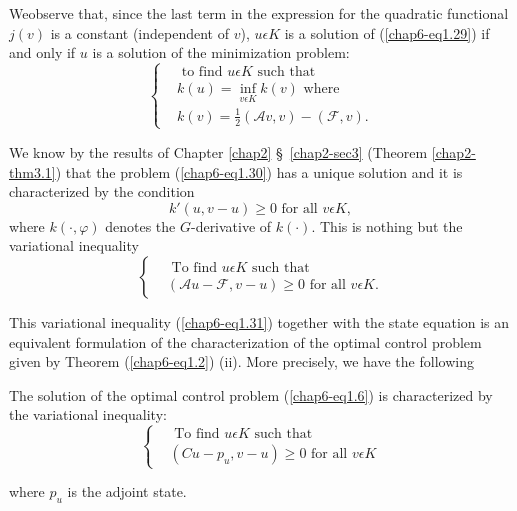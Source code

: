 We\pageoriginale observe that, since the last term in the expression
for the quadra\-tic functional $j(v)$ is a constant (independent of $v$),
$u \epsilon K$ is a solution of (\ref{chap6-eq1.29}) if and only if $u$
is a solution of the minimization problem: 
\begin{equation*}
\begin{cases}
& \text{ to find } u \epsilon K \text{ such that }\\
& k(u) = \inf_{v \epsilon K} k(v) \text{ where }\\
& k(v) = \frac{1}{2} (\mathscr{A} v, v) - (\mathscr{F}, v).\tag{1.30}\label{chap6-eq1.30}
\end{cases}
\end{equation*}

We know by the results of Chapter \ref{chap2} \S\ \ref{chap2-sec3}
(Theorem \ref{chap2-thm3.1}) that the problem (\ref{chap6-eq1.30}) has
a unique solution and it is characterized by the condition 
$$
k' (u, v - u) \geq 0 \text{ for all } v \epsilon K,
$$
where $k(\cdot , \varphi)$ denotes the $G$-derivative of $k( \cdot
)$. This is nothing but the variational inequality 
\begin{equation*}
\begin{cases}
& \text{ To find } u \epsilon K \text{ such that }\\
& (\mathscr{A}u - \mathscr{F}, v-u) \geq 0 \text{ for all } v \epsilon K.\tag{1.31}\label{chap6-eq1.31}
\end{cases}
\end{equation*}

This variational inequality (\ref{chap6-eq1.31}) together with the
state equation is an equivalent formulation of the characterization of
the optimal control problem given by Theorem (\ref{chap6-eq1.2})
(ii). More precisely, we have the following 

\begin{theorem}\label{chap6-thm1.3a}
The solution of the optimal control problem (\ref{chap6-eq1.6}) is
characterized by the variational inequality: 
\begin{equation*}
\begin{cases}
& \text{ To find } u \epsilon K \text{ such that }\\
& (Cu - p_{u}, v - u) \geq 0 \text{ for all } v \epsilon K\tag{1.32}\label{chap6-eq1.32}
\end{cases}
\end{equation*}
\end{theorem}
where $p_{u}$ is the adjoint state.

